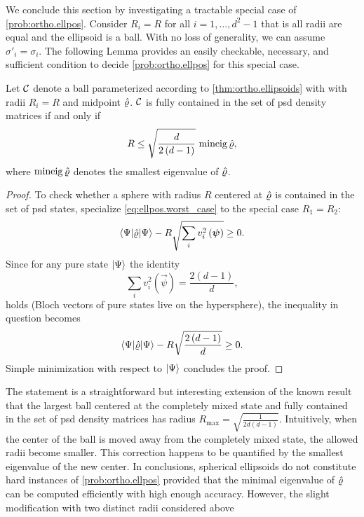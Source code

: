 We conclude this section by investigating a tractable special case of \cref{prob:ortho.ellpos}.
Consider $R_{i}=R$ for all $i=1,\ldots,d^{2}-1$ that is all radii are equal and the ellipsoid is a ball.
With no loss of generality, we can assume $\sigma'_i = \sigma_i$.
The following Lemma provides an easily checkable, necessary, and sufficient condition to decide \cref{prob:ortho.ellpos} for this special case.
\begin{lemma}\label{lem:ortho.spheres}
  Let $\mathcal{C}$ denote a ball parameterized according to \cref{thm:ortho.ellipsoids} with with radii $R_i=R$ and midpoint $\hat{\varrho}$.
  $\mathcal{C}$ is fully contained in the set of psd density matrices if and only if
  \[
    R\leq\sqrt{\frac{d}{2\left(d-1\right)}} \, \operatorname{mineig} \hat{\varrho},
  \]
  where $\operatorname{mineig}\hat{\varrho}$ denotes the smallest eigenvalue of $\hat{\varrho}$.
\end{lemma}
\begin{proof}
  To check whether a sphere with radius $R$ centered at $\hat{\varrho}$ is contained in the set of psd states, specialize \cref{eq:ellpos.worst_case} to the special case $R_1 = R_2$:
  \[
    \bra{\Psi}\estim{\varrho} \ket{\Psi} -R\sqrt{\sum_{i}v_{i}^2\left(\vec\psi\right)}\geq0.
   \label{eq:spheres.worst_case}
  \]
  Since for any pure state $ \ket{\Psi} $ the identity
  \[
    \sum_{i}v_{i}^{2}\left(\vec\psi\right)=\frac{2\left(d-1\right)}{d},\label{puresum-1}
  \]
  holds (Bloch vectors of pure states live on the hypersphere), the inequality in question becomes
  \[
    \bra{\Psi}\estim{\varrho} \ket{\Psi} -R\sqrt{\frac{2\left(d-1\right)}{d}}\geq0.
  \]
  Simple minimization with respect to $ \ket{\Psi} $ concludes the proof.
\end{proof}

The statement is a straightforward but interesting extension of the known result that the largest ball centered at the completely mixed state and fully contained in the set of psd density matrices has radius $R_{\mathrm{max}}=\sqrt{\frac{1}{2d\left(d-1\right)}}$.
Intuitively, when the center of the ball is moved away from the completely mixed state, the allowed radii become smaller.
This correction happens to be quantified by the smallest eigenvalue of the new center.
In conclusions, spherical ellipsoids do not constitute hard instances of \cref{prob:ortho.ellpos} provided that the minimal eigenvalue of $\hat{\varrho}$ can be computed efficiently with high enough accuracy.
However, the slight modification with two distinct radii considered above



